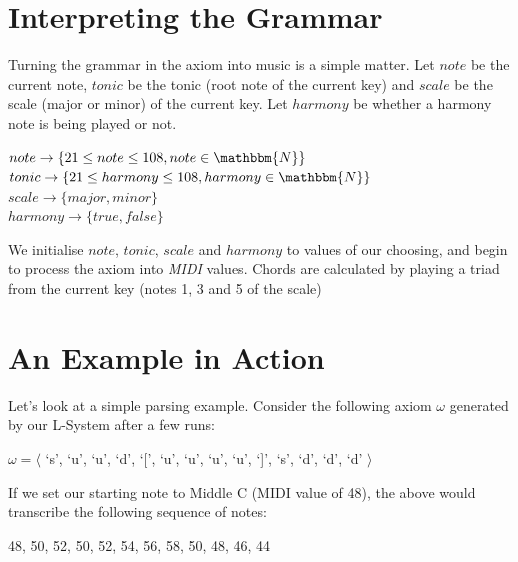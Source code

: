 \section{Interpreting the Grammar}

Turning the grammar in the axiom into music is a simple matter. Let $note$ be the current note, $tonic$ be the tonic (root note of the current key) and $scale$ be the scale (major or minor) of the current key. Let $harmony$ be whether a harmony note is being played or not.

\begin{singlespace}
\begin{formality}
$note \rightarrow \{ 21 \leq note \leq 108, note \in \mathbbm{N} \}$ \\
$tonic \rightarrow \{ 21 \leq harmony \leq 108, harmony \in \mathbbm{N} \}$ \\
$scale \rightarrow \{ major, minor \}$ \\
$harmony \rightarrow \{ true, false \}$
\end{formality}
\end{singlespace}

We initialise $note$, $tonic$, $scale$ and $harmony$ to values of our choosing, and begin to process the axiom into \textit{MIDI} values. Chords are calculated by playing a triad from the current key (notes 1, 3 and 5 of the scale)


\section{An Example in Action}

Let's look at a simple parsing example. Consider the following axiom $\omega$ generated by our L-System after a few runs:

\begin{singlespace}
\begin{formality}
$\omega = \langle$ `s', `u', `u', `d', `[', `u', `u', `u', `u', `]', `s', `d', `d', `d' $\rangle$
\end{formality}
\end{singlespace}

If we set our starting note to Middle C (MIDI value of 48), the above would transcribe the following sequence of notes:

\begin{singlespace}
\begin{formality}
48, 50, 52, 50, 52, 54, 56, 58, 50, 48, 46, 44
\end{formality}
\end{singlespace}

